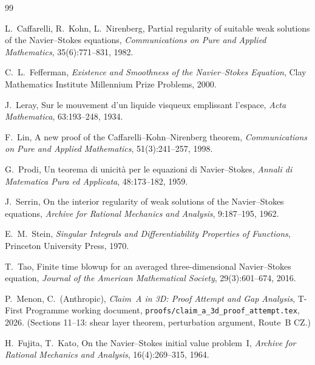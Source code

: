 \documentclass[11pt]{article}
\theoremstyle{definition}
\theoremstyle{remark}
\begin{document}
\begin{thebibliography}{99}

  L.~Caffarelli, R.~Kohn, L.~Nirenberg,
  Partial regularity of suitable weak solutions of the Navier--Stokes equations,
  \emph{Communications on Pure and Applied Mathematics}, 35(6):771--831, 1982.

  C.~L.~Fefferman,
  \emph{Existence and Smoothness of the Navier--Stokes Equation},
  Clay Mathematics Institute Millennium Prize Problems, 2000.

  J.~Leray,
  Sur le mouvement d'un liquide visqueux emplissant l'espace,
  \emph{Acta Mathematica}, 63:193--248, 1934.

  F.~Lin,
  A new proof of the Caffarelli--Kohn--Nirenberg theorem,
  \emph{Communications on Pure and Applied Mathematics}, 51(3):241--257, 1998.

  G.~Prodi,
  Un teorema di unicità per le equazioni di Navier--Stokes,
  \emph{Annali di Matematica Pura ed Applicata}, 48:173--182, 1959.

  J.~Serrin,
  On the interior regularity of weak solutions of the Navier--Stokes equations,
  \emph{Archive for Rational Mechanics and Analysis}, 9:187--195, 1962.

  E.~M.~Stein,
  \emph{Singular Integrals and Differentiability Properties of Functions},
  Princeton University Press, 1970.

  T.~Tao,
  Finite time blowup for an averaged three-dimensional Navier--Stokes equation,
  \emph{Journal of the American Mathematical Society}, 29(3):601--674, 2016.

  P.~Menon, C.~(Anthropic),
  \emph{Claim~A in 3D: Proof Attempt and Gap Analysis},
  T-First Programme working document,
  \texttt{proofs/claim\_a\_3d\_proof\_attempt.tex}, 2026.
  (Sections 11--13: shear layer theorem, perturbation argument, Route~B CZ.)

  H.~Fujita, T.~Kato,
  On the Navier--Stokes initial value problem~I,
  \emph{Archive for Rational Mechanics and Analysis}, 16(4):269--315, 1964.

\end{thebibliography}

\end{document}
